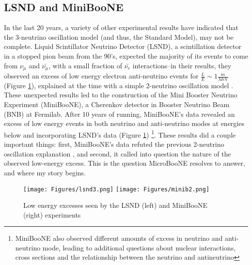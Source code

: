 \documentclass[12pt]{article}
\begin{document}
\subsection{LSND and MiniBooNE}
In the last 20 years, a variety of other experimental results have indicated that the 3-neutrino oscillation model (and thus, the Standard Model), may not be complete. Liquid Scintillator Neutrino Detector (LSND), a scintillation detector in a stopped pion beam from the 90's, expected the majority of its events to come from $\nu_\mu$ and $\bar{\nu_\mu}$, with a small fraction of $\bar{\nu_e}$ interactions--in their results, they observed an excess of low energy electron anti-neutrino events for $\frac{L}{E} \sim 1 \frac{m}{MeV}$ (Figure \ref{fig:lsnd}), explained at the time with a simple 2-neutrino oscillation model \cite{lsnd}. These unexpected results led to the construction of the Mini Booster Neutrino Experiment (MiniBooNE), a Cherenkov detector in Booster Neutrino Beam (BNB) at Fermilab. After 10 years of running, MiniBooNE's data revealed an excess of low energy events in both neutrino and anti-neutrino modes at energies below and incorporating LSND's data (Figure \ref{fig:lsnd}) \footnote{ MiniBooNE also observed different amounts of excess in neutrino and anti-neutrino mode, leading to additional questions about nuclear interactions, cross sections and the relationship between the neutrino and antineutrino\cite{miniboone}}.  These results did a couple important things: first, MiniBooNE's data refuted the previous 2-neutrino oscillation explanation \cite{miniboone}, and second, it called into question the nature of the observed low-energy excess. This is the question MicroBooNE resolves to answer, and where my story begins. 
\begin{figure}[h!]
\centering
\texttt{[image: Figures/lsnd3.png]}
\hspace{1.5 cm}
\texttt{[image: Figures/minib2.png]}
\caption{Low energy excesses seen by the LSND (left) and MiniBooNE (right) experiments}
\label{fig:lsnd}
\end{figure}
\end{document}
